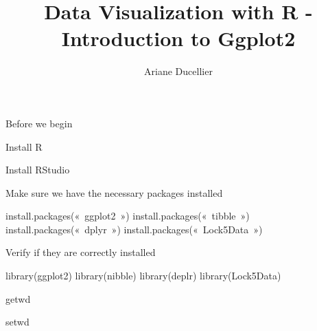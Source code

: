 \documentclass{beamer}
\title[Introduction to Ggplot2]{Data Visualization with R - Introduction to Ggplot2}
\author{Ariane Ducellier}
\begin{document}
	\begin{frame}
		\titlepage
	\end{frame}

	\begin{frame}


Before we begin

Install R

Install RStudio

Make sure we have the necessary packages installed

install.packages(« ggplot2 »)
install.packages(« tibble »)
install.packages(« dplyr »)
install.packages(« Lock5Data »)

Verify if they are correctly installed

library(ggplot2)
library(nibble)
library(deplr)
library(Lock5Data)

getwd

setwd

	\end{frame}
\end{document}
